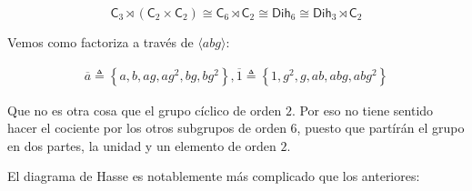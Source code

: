 \documentclass[12pt,a4paper,fleqn,spanish,final,openright]{extbook}
\theoremstyle{definition}
\theoremstyle{remark}
\begin{document}
\[{\mathsf{C}_{3}}\rtimes{\left({{\mathsf{C}_{2}}\times{\mathsf{C}_{2}}}\right)}\cong{\mathsf{C}_{6}}\rtimes{\mathsf{C}_{2}}\cong\mathsf{Dih}_{6}\cong{\mathsf{Dih}_{3}}\rtimes{\mathsf{C}_{2}}\] 

Vemos como factoriza a través de $\langle abg\rangle$:

\begin{align*}
\overline{a}\triangleq{\left\lbrace{a,b,ag,ag^2,bg,bg^2}\right\rbrace},
\overline{1}\triangleq{\left\lbrace{1,g^2,g,ab,abg,abg^2}\right\rbrace}
\end{align*}

Que no es otra cosa que el grupo cíclico de orden $2$. Por eso no tiene sentido hacer el cociente por los otros subgrupos de orden $6$, puesto que partírán el grupo en dos partes, la unidad y un elemento de orden $2$.

El diagrama de Hasse es notablemente más complicado que  los anteriores:
\end{document}
